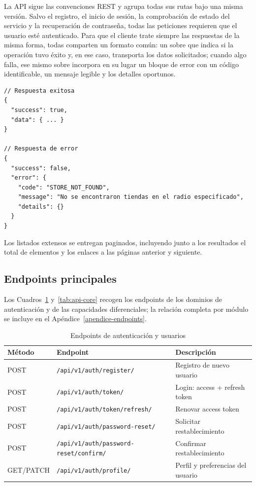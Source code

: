 La API sigue las convenciones REST y agrupa todas sus rutas bajo una misma versi\'on. Salvo el
registro, el inicio de sesi\'on, la comprobaci\'on de estado del servicio y la recuperaci\'on de
contrase\~na, todas las peticiones requieren que el usuario est\'e autenticado. Para que el cliente
trate siempre las respuestas de la misma forma, todas comparten un formato com\'un: un sobre que
indica si la operaci\'on tuvo \'exito y, en ese caso, transporta los datos solicitados; cuando algo
falla, ese mismo sobre incorpora en su lugar un bloque de error con un c\'odigo identificable, un
mensaje legible y los detalles oportunos.

\begin{verbatim}
// Respuesta exitosa
{
  "success": true,
  "data": { ... }
}

// Respuesta de error
{
  "success": false,
  "error": {
    "code": "STORE_NOT_FOUND",
    "message": "No se encontraron tiendas en el radio especificado",
    "details": {}
  }
}
\end{verbatim}

Los listados extensos se entregan paginados, incluyendo junto a los resultados el total de
elementos y los enlaces a las p\'aginas anterior y siguiente.

\subsection{Endpoints principales}\label{subsec:api-endpoints}

Los Cuadros~\ref{tab:api-auth} y~\ref{tab:api-core} recogen los endpoints de los dominios de
autenticaci\'on y de las capacidades diferenciales; la relaci\'on completa por m\'odulo se
incluye en el Ap\'endice~\ref{apendice-endpoints}.

\begin{table}[htbp]
\centering
\caption{Endpoints de autenticaci\'on y usuarios}
\label{tab:api-auth}
\small
\begin{tabular}{@{}lll@{}}
\toprule
\textbf{M\'etodo} & \textbf{Endpoint} & \textbf{Descripci\'on} \\
\midrule
POST & \texttt{/api/v1/auth/register/} & Registro de nuevo usuario \\
POST & \texttt{/api/v1/auth/token/} & Login: access + refresh token \\
POST & \texttt{/api/v1/auth/token/refresh/} & Renovar access token \\
POST & \texttt{/api/v1/auth/password-reset/} & Solicitar restablecimiento \\
POST & \texttt{/api/v1/auth/password-reset/confirm/} & Confirmar restablecimiento \\
GET/PATCH & \texttt{/api/v1/auth/profile/} & Perfil y preferencias del usuario \\
\bottomrule
\end{tabular}
\end{table}

